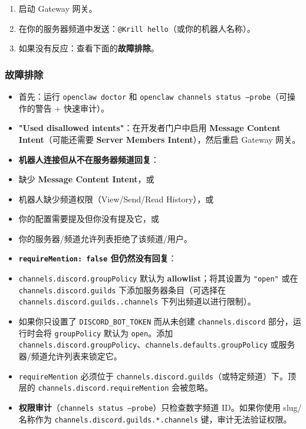 \begin{enumerate}
  \item 启动 Gateway 网关。
  \item 在你的服务器频道中发送：\texttt{@Krill hello}（或你的机器人名称）。
  \item 如果没有反应：查看下面的\textbf{故障排除}。
\end{enumerate}


\subsubsection{故障排除}


\begin{itemize}
  \item 首先：运行 \texttt{openclaw doctor} 和 \texttt{openclaw channels status --probe}（可操作的警告 + 快速审计）。
  \item \textbf{"Used disallowed intents"}：在开发者门户中启用 \textbf{Message Content Intent}（可能还需要 \textbf{Server Members Intent}），然后重启 Gateway 网关。
  \item \textbf{机器人连接但从不在服务器频道回复}：
  \item 缺少 \textbf{Message Content Intent}，或
  \item 机器人缺少频道权限（View/Send/Read History），或
  \item 你的配置需要提及但你没有提及它，或
  \item 你的服务器/频道允许列表拒绝了该频道/用户。
  \item \textbf{\texttt{requireMention: false} 但仍然没有回复}：
  \item \texttt{channels.discord.groupPolicy} 默认为 \textbf{allowlist}；将其设置为 \texttt{"open"} 或在 \texttt{channels.discord.guilds} 下添加服务器条目（可选择在 \texttt{channels.discord.guilds..channels} 下列出频道以进行限制）。
  \item 如果你只设置了 \texttt{DISCORD\_BOT\_TOKEN} 而从未创建 \texttt{channels.discord} 部分，运行时会将 \texttt{groupPolicy} 默认为 \texttt{open}。添加 \texttt{channels.discord.groupPolicy}、\texttt{channels.defaults.groupPolicy} 或服务器/频道允许列表来锁定它。
  \item \texttt{requireMention} 必须位于 \texttt{channels.discord.guilds}（或特定频道）下。顶层的 \texttt{channels.discord.requireMention} 会被忽略。
  \item \textbf{权限审计}（\texttt{channels status --probe}）只检查数字频道 ID。如果你使用 slug/名称作为 \texttt{channels.discord.guilds.*.channels} 键，审计无法验证权限。

\end{itemize}
